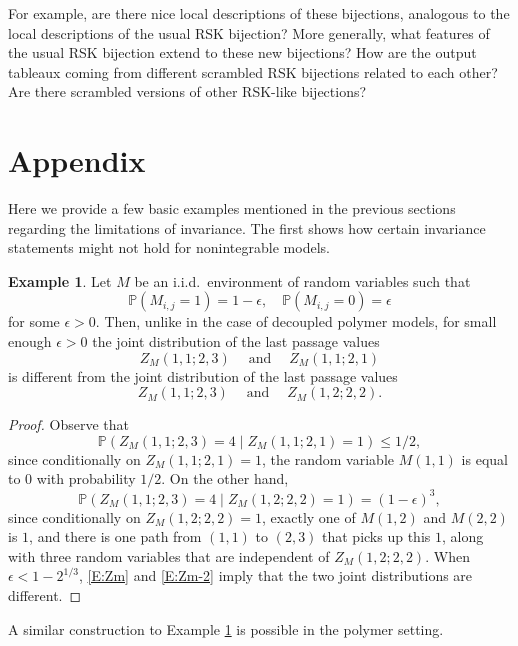 \documentclass[aop, preprint]{imsart}
\theoremstyle{plain}
\theoremstyle{definition}
\newtheorem{example}[theorem]{Example} %
\theoremstyle{plain}
\newcommand{\p}{\mathbb{P}}
\newcommand{\mathand}{\;\text{and}\;}
\newcommand{\ep}{\epsilon}
\begin{document}
For example, are there nice local descriptions of these bijections, analogous to the local descriptions of the usual RSK bijection? More generally, what features of the usual RSK bijection extend to these new bijections? How are the output tableaux coming from different scrambled RSK bijections related to each other? Are there scrambled versions of other RSK-like bijections?

\section{Appendix}
\label{S:appendix}

Here we provide a few basic examples mentioned in the previous sections regarding the limitations of invariance. The first shows how certain invariance statements might not hold for nonintegrable models. 

\begin{example}
	\label{E:nonintegrable}
	Let $M$ be an i.i.d.\ environment of random variables such that
	$$
	\p(M_{i, j} = 1) = 1 - \ep, \quad \p(M_{i, j} = 0) = \ep
	$$
	for some $\ep > 0$. Then, unlike in the case of decoupled polymer models, for small enough $\ep > 0$ the joint distribution of the last passage values
	$$
	Z_M(1, 1; 2, 3) \quad \mathand \quad Z_M(1, 1; 2, 1)
	$$
	is different from the joint distribution of the last passage values
	$$
	Z_M(1, 1; 2, 3) \quad \mathand \quad Z_M(1, 2; 2, 2).
	$$
\end{example}

\begin{proof}
	Observe that
	\begin{equation}
	\label{E:Zm}
	\p( Z_M(1, 1; 2, 3)  = 4 \; | \;Z_M(1, 1; 2, 1) = 1) \le 1/2,
	\end{equation}
	since conditionally on $Z_M(1, 1; 2, 1) = 1$, the random variable $M(1, 1)$ is equal to $0$ with probability $1/2$. On the other hand,
	\begin{equation}
	\label{E:Zm-2}
	\p( Z_M(1, 1; 2, 3)  = 4 \; | \;Z_M(1, 2; 2, 2) = 1) = (1- \ep)^3,
	\end{equation}
	since conditionally on $Z_M(1, 2; 2, 2) = 1$, exactly one of $M(1, 2)$ and $M(2, 2)$ is $1$, and there is one path from $(1, 1)$ to $(2, 3)$ that picks up this $1$, along with three random variables that are independent of $Z_M(1, 2; 2,2)$. When $\ep < 1 - 2^{1/3}$, \eqref{E:Zm} and \eqref{E:Zm-2} imply that the two joint distributions are different.
\end{proof}

A similar construction to Example \ref{E:nonintegrable} is possible in the polymer setting.
\end{document}
